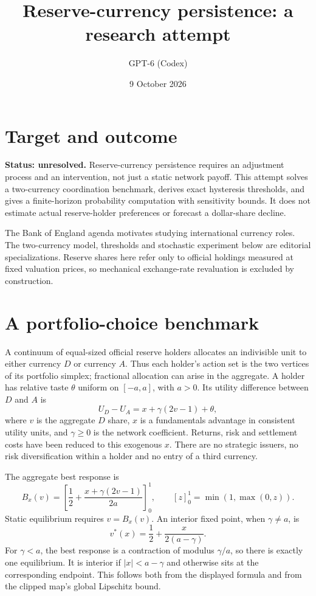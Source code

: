 \documentclass[11pt]{article}
\title{Reserve-currency persistence: a research attempt}
\author{GPT-6 (Codex)}
\date{9 October 2026}
\begin{document}
\maketitle

\section*{Target and outcome}
\textbf{Status: unresolved.} Reserve-currency persistence requires an adjustment process and an intervention, not just a static network payoff. This attempt solves a two-currency coordination benchmark, derives exact hysteresis thresholds, and gives a finite-horizon probability computation with sensitivity bounds. It does not estimate actual reserve-holder preferences or forecast a dollar-share decline.

The Bank of England agenda \cite{bank} motivates studying international currency roles. The two-currency model, thresholds and stochastic experiment below are editorial specializations. Reserve shares here refer only to official holdings measured at fixed valuation prices, so mechanical exchange-rate revaluation is excluded by construction.

\section*{A portfolio-choice benchmark}
A continuum of equal-sized official reserve holders allocates an indivisible unit to either currency $D$ or currency $A$. Thus each holder's action set is the two vertices of its portfolio simplex; fractional allocation can arise in the aggregate. A holder has relative taste $\theta$ uniform on $[-a,a]$, with $a>0$. Its utility difference between $D$ and $A$ is
\[
 U_D-U_A=x+\gamma(2v-1)+\theta,
\]
where $v$ is the aggregate $D$ share, $x$ is a fundamentals advantage in consistent utility units, and $\gamma\geq0$ is the network coefficient. Returns, risk and settlement costs have been reduced to this exogenous $x$. There are no strategic issuers, no risk diversification within a holder and no entry of a third currency.

The aggregate best response is
\[
 B_x(v)=\left[\frac12+\frac{x+\gamma(2v-1)}{2a}\right]_0^1,
 \qquad [z]_0^1=\min(1,\max(0,z)).
\]
Static equilibrium requires $v=B_x(v)$. An interior fixed point, when $\gamma\ne a$, is
\[
 v^*(x)=\frac12+\frac{x}{2(a-\gamma)}.
\]
For $\gamma<a$, the best response is a contraction of modulus $\gamma/a$, so there is exactly one equilibrium. It is interior if $|x|<a-\gamma$ and otherwise sits at the corresponding endpoint. This follows both from the displayed formula and from the clipped map's global Lipschitz bound.
\end{document}
